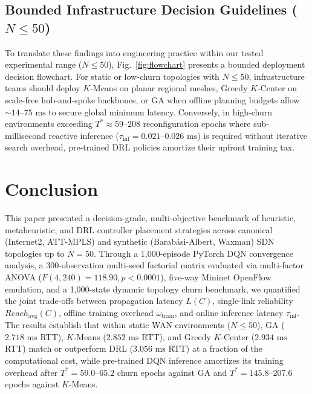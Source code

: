\documentclass[conference]{IEEEtran}
\begin{document}
\subsection{Bounded Infrastructure Decision Guidelines ($N \le 50$)}
To translate these findings into engineering practice within our tested experimental range ($N \le 50$), Fig.~\ref{fig:flowchart} presents a bounded deployment decision flowchart. For static or low-churn topologies with $N \le 50$, infrastructure teams should deploy $K$-Means on planar regional meshes, Greedy $K$-Center on scale-free hub-and-spoke backbones, or GA when offline planning budgets allow $\sim 14\text{--}75\text{ ms}$ to secure global minimum latency. Conversely, in high-churn environments exceeding $T^* \approx 59\text{--}208$ reconfiguration epochs where sub-millisecond reactive inference ($\tau_{\text{inf}} = 0.021\text{--}0.026\text{ ms}$) is required without iterative search overhead, pre-trained DRL policies amortize their upfront training tax.

\section{Conclusion}
This paper presented a decision-grade, multi-objective benchmark of heuristic, metaheuristic, and DRL controller placement strategies across canonical (Internet2, ATT-MPLS) and synthetic (Barab\'{a}si-Albert, Waxman) SDN topologies up to $N = 50$. Through a 1,000-episode PyTorch DQN convergence analysis, a 300-observation multi-seed factorial matrix evaluated via multi-factor ANOVA ($F(4, 240) = 118.90, p < 0.0001$), five-way Mininet OpenFlow emulation, and a 1,000-state dynamic topology churn benchmark, we quantified the joint trade-offs between propagation latency $L(C)$, single-link reliability $Reach_{\text{avg}}(C)$, offline training overhead $\omega_{\text{train}}$, and online inference latency $\tau_{\text{inf}}$. The results establish that within static WAN environments ($N \le 50$), GA ($2.718\text{ ms}$ RTT), $K$-Means ($2.852\text{ ms}$ RTT), and Greedy $K$-Center ($2.934\text{ ms}$ RTT) match or outperform DRL ($3.056\text{ ms}$ RTT) at a fraction of the computational cost, while pre-trained DQN inference amortizes its training overhead after $T^* = 59.0\text{--}65.2$ churn epochs against GA and $T^* = 145.8\text{--}207.6$ epochs against $K$-Means.
\end{document}
